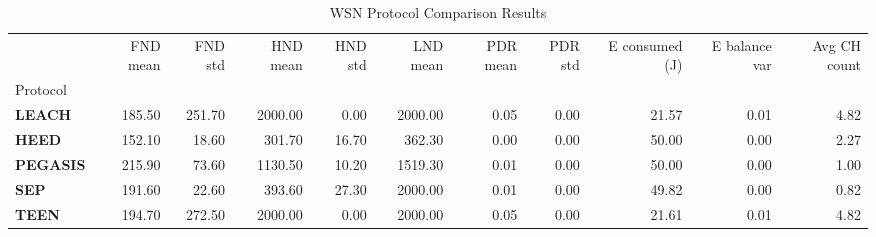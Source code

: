 \begin{table}
\caption{WSN Protocol Comparison Results}
\label{tab:wsn_comparison}
\begin{tabular}{lrrrrrrrrrr}
\toprule
 & FND mean & FND std & HND mean & HND std & LND mean & PDR mean & PDR std & E consumed (J) & E balance var & Avg CH count \\
Protocol &  &  &  &  &  &  &  &  &  &  \\
\midrule
\textbf{LEACH} & 185.50 & 251.70 & 2000.00 & 0.00 & 2000.00 & 0.05 & 0.00 & 21.57 & 0.01 & 4.82 \\
\textbf{HEED} & 152.10 & 18.60 & 301.70 & 16.70 & 362.30 & 0.00 & 0.00 & 50.00 & 0.00 & 2.27 \\
\textbf{PEGASIS} & 215.90 & 73.60 & 1130.50 & 10.20 & 1519.30 & 0.01 & 0.00 & 50.00 & 0.00 & 1.00 \\
\textbf{SEP} & 191.60 & 22.60 & 393.60 & 27.30 & 2000.00 & 0.01 & 0.00 & 49.82 & 0.00 & 0.82 \\
\textbf{TEEN} & 194.70 & 272.50 & 2000.00 & 0.00 & 2000.00 & 0.05 & 0.00 & 21.61 & 0.01 & 4.82 \\
\bottomrule
\end{tabular}
\end{table}
